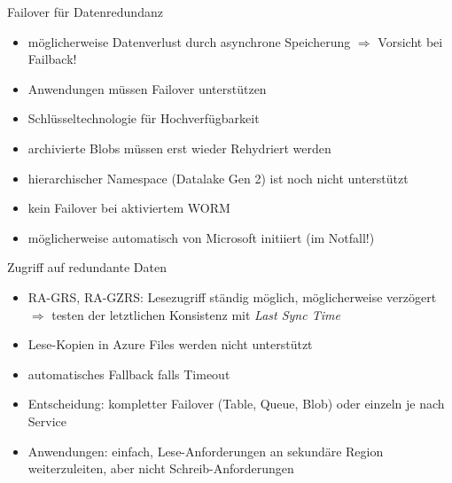 \begin{flashcard}[Definition]{Failover für Datenredundanz}
  \begin{itemize}
    \item möglicherweise Datenverlust durch asynchrone Speicherung\newline
      $\Rightarrow$ Vorsicht bei Failback!    
    \item Anwendungen müssen Failover unterstützen
    \item Schlüsseltechnologie für Hochverfügbarkeit
    \item archivierte Blobs müssen erst wieder Rehydriert werden
    \item hierarchischer Namespace (Datalake Gen 2) ist noch nicht unterstützt
    \item kein Failover bei aktiviertem WORM
    \item möglicherweise automatisch von Microsoft initiiert (im Notfall!)
  \end{itemize}
\end{flashcard}


\begin{flashcard}[Definition]{Zugriff auf redundante Daten}
  \begin{itemize}
    \item RA-GRS, RA-GZRS: Lesezugriff ständig möglich, möglicherweise verzögert\newline
    $\Rightarrow$ testen der letztlichen Konsistenz mit \emph{Last Sync Time}
    \item Lese-Kopien in Azure Files werden nicht unterstützt
    \item automatisches Fallback falls Timeout
    \item Entscheidung: kompletter Failover (Table, Queue, Blob) oder einzeln je nach Service
    \item Anwendungen: einfach, Lese-Anforderungen an sekundäre Region weiterzuleiten, aber nicht Schreib-Anforderungen
  \end{itemize}
\end{flashcard}

